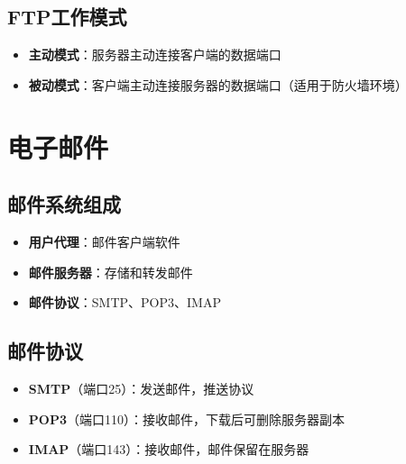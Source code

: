 \subsection{FTP工作模式}
\begin{itemize}[leftmargin=2em,itemsep=0pt]
    \item \textbf{主动模式}：服务器主动连接客户端的数据端口
    \item \textbf{被动模式}：客户端主动连接服务器的数据端口（适用于防火墙环境）
\end{itemize}

\section{电子邮件}
\subsection{邮件系统组成}
\begin{itemize}[leftmargin=2em,itemsep=0pt]
    \item \textbf{用户代理}：邮件客户端软件
    \item \textbf{邮件服务器}：存储和转发邮件
    \item \textbf{邮件协议}：SMTP、POP3、IMAP
\end{itemize}

\subsection{邮件协议}
\begin{itemize}[leftmargin=2em,itemsep=0pt]
    \item \textbf{SMTP}（端口25）：发送邮件，推送协议
    \item \textbf{POP3}（端口110）：接收邮件，下载后可删除服务器副本
    \item \textbf{IMAP}（端口143）：接收邮件，邮件保留在服务器
\end{itemize}

\begin{center}
\end{center}

